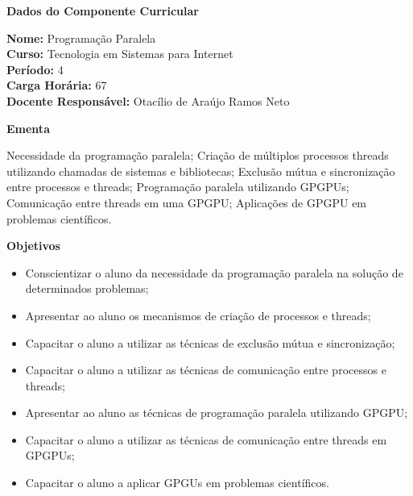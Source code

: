

\begin{snugshade}\begin{center}\textbf{
	Dados do Componente Curricular
}\end{center}\end{snugshade}

\noindent 	\textbf{Nome:} Programação Paralela
\\ 			\textbf{Curso:} Tecnologia em Sistemas para Internet
\\ 			\textbf{Período:} \unit{4}{\degree}
\\ 			\textbf{Carga Horária:} \unit{67}{\hour}
\\ 			\textbf{Docente Responsável:} Otacílio de Araújo Ramos Neto


\begin{snugshade}\begin{center}\textbf{
    Ementa
\vphantom{q}}\end{center}\end{snugshade}

\noindent
Necessidade da programação paralela; Criação de múltiplos processos threads utilizando chamadas de sistemas e bibliotecas; Exclusão mútua e sincronização entre processos e threads; Programação paralela utilizando GPGPUs; Comunicação entre threads em uma GPGPU; Aplicações de GPGPU em problemas científicos.

\begin{snugshade}\begin{center}\textbf{
    Objetivos
}\end{center}\end{snugshade}

\begin{itemize}

\item Conscientizar o aluno da necessidade da programação paralela na solução de determinados problemas;
\item Apresentar ao aluno os mecanismos de criação de processos e threads;
\item Capacitar o aluno a utilizar as técnicas de exclusão mútua e sincronização;
\item Capacitar o aluno a utilizar as técnicas de comunicação entre processos e threads;
\item Apresentar ao aluno as técnicas de programação paralela utilizando GPGPU;
\item Capacitar o aluno a utilizar as técnicas de comunicação entre threads em GPGPUs;
\item Capacitar o aluno a aplicar GPGUs em problemas científicos.

\end{itemize} 


